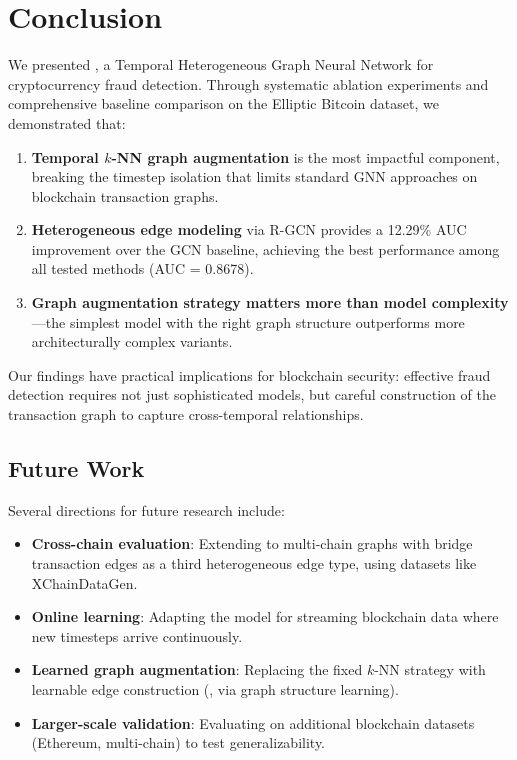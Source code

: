 \section{Conclusion}

We presented \ours{}, a Temporal Heterogeneous Graph Neural Network for cryptocurrency fraud detection. Through systematic ablation experiments and comprehensive baseline comparison on the Elliptic Bitcoin dataset, we demonstrated that:

\begin{enumerate}
    \item \textbf{Temporal $k$-NN graph augmentation} is the most impactful component, breaking the timestep isolation that limits standard GNN approaches on blockchain transaction graphs.
    \item \textbf{Heterogeneous edge modeling} via R-GCN provides a 12.29\% AUC improvement over the GCN baseline, achieving the best performance among all tested methods (AUC = 0.8678).
    \item \textbf{Graph augmentation strategy matters more than model complexity}---the simplest model with the right graph structure outperforms more architecturally complex variants.
\end{enumerate}

Our findings have practical implications for blockchain security: effective fraud detection requires not just sophisticated models, but careful construction of the transaction graph to capture cross-temporal relationships.

\subsection{Future Work}

Several directions for future research include:

\begin{itemize}
    \item \textbf{Cross-chain evaluation}: Extending \ours{} to multi-chain graphs with bridge transaction edges as a third heterogeneous edge type, using datasets like XChainDataGen.
    \item \textbf{Online learning}: Adapting the model for streaming blockchain data where new timesteps arrive continuously.
    \item \textbf{Learned graph augmentation}: Replacing the fixed $k$-NN strategy with learnable edge construction (\eg, via graph structure learning).
    \item \textbf{Larger-scale validation}: Evaluating on additional blockchain datasets (Ethereum, multi-chain) to test generalizability.
\end{itemize}
